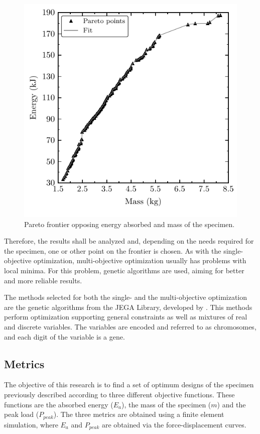 \documentclass[cmfonts]{witpress}
\begin{document}
\begin{figure}[htpb]
  \centering
   \includegraphics[width=.8\columnwidth]{figures/IMG/Pareto}
  \caption{Pareto frontier opposing energy absorbed and mass of the specimen.}
  \label{fig:Pareto}
\end{figure}

Therefore, the results shall be analyzed and, depending on the needs required for the specimen, one or other point on the frontier is chosen. As with the single-objective optimization, multi-objective optimization usually has problems with local minima. For this problem, genetic algorithms are used, aiming for better and more reliable results.

The methods selected for both the single- and the multi-objective optimization are the genetic algorithms from the JEGA Library, developed by \cite{JEGA}. This methods perform optimization supporting general constraints as well as mixtures of real and discrete variables. The variables are encoded and referred to as chromosomes, and each digit of the variable is a gene.

\subsection{Metrics}
The objective of this research is to find a set of optimum designs of the specimen previously described according to three different objective functions. These functions are the absorbed energy ($E_a$), the mass of the specimen ($m$) and the peak load ($P_{peak}$). The three metrics are obtained using a finite element simulation, where $E_a$ and $P_{peak}$ are obtained via the force-displacement curves.
\end{document}

